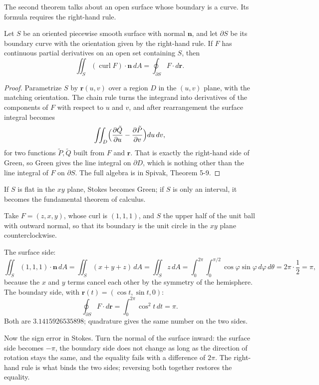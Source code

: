 The second theorem talks about an open surface whose boundary is a curve.
Its formula requires the right-hand rule.

\begin{teorema}[Stokes]
Let $S$ be an oriented piecewise smooth surface with normal
$\mathbf{n}$, and let $\partial S$ be its boundary curve with the orientation given by the
right-hand rule. If $F$ has continuous partial derivatives on an open set
containing $S$, then
\[
\iint_{S}(\operatorname{curl}F)\cdot\mathbf{n}\,dA
=\oint_{\partial S}F\cdot d\mathbf{r}.
\]
\end{teorema}

\begin{proof}
Parametrize $S$ by $\mathbf{r}(u,v)$ over a region $D$ in the $(u,v)$ plane,
with the matching orientation. The chain rule turns the integrand into
derivatives of the components of $F$ with respect to $u$ and $v$, and after rearrangement the surface
integral becomes
\[
\iint_{D}\Bigl(\frac{\partial \tilde{Q}}{\partial u}
-\frac{\partial \tilde{P}}{\partial v}\Bigr)du\,dv ,
\]
for two functions $\tilde{P},\tilde{Q}$ built from $F$ and
$\mathbf{r}$. That is exactly the right-hand side of Green, so Green gives the line integral
on $\partial D$, which is nothing other than the line integral of $F$ on $\partial S$.
The full algebra is in Spivak, Theorem 5-9.
\end{proof}

If $S$ is flat in the $xy$ plane, Stokes becomes Green; if $S$ is only an
interval, it becomes the fundamental theorem of calculus.

\begin{contoh}
Take $F=(z,x,y)$, whose curl is $(1,1,1)$, and $S$ the upper half of the unit ball
with outward normal, so that its boundary is the unit circle in the $xy$ plane
counterclockwise.

The surface side:
\[
\iint_{S}(1,1,1)\cdot\mathbf{n}\,dA=\iint_{S}(x+y+z)\,dA=\iint_{S}z\,dA
=\int_{0}^{2\pi}\!\!\int_{0}^{\pi/2}\cos\varphi\sin\varphi\,d\varphi\,d\theta
=2\pi\cdot\frac12=\pi ,
\]
because the $x$ and $y$ terms cancel each other by the symmetry of the hemisphere. The boundary side, with
$\mathbf{r}(t)=(\cos t,\sin t,0)$:
\[
\oint_{\partial S}F\cdot d\mathbf{r}=\int_{0}^{2\pi}\cos^{2}t\,dt=\pi .
\]
Both are $3.1415926535898$; quadrature gives the same number on the two sides.
\end{contoh}

Now the sign error in Stokes. Turn the normal of the surface inward:
the surface side becomes $-\pi$, the boundary side does not change as long as the direction of rotation
stays the same, and the equality fails with a difference of $2\pi$. The right-hand rule is what
binds the two sides; reversing both together restores the equality.

